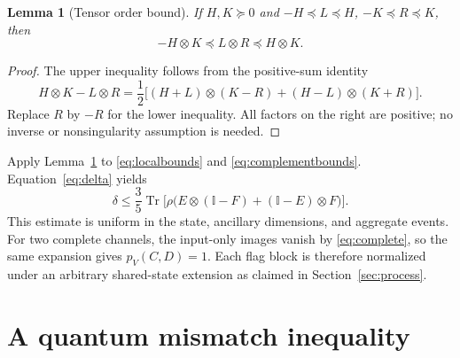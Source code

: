 \documentclass[11pt,letterpaper]{article}
\newtheorem{lemma}[theorem]{Lemma}
\theoremstyle{remark}\newtheorem{remark}[theorem]{Remark}
\newcommand{\Tr}{\operatorname{Tr}}
\newcommand{\I}{\mathbb I}
\begin{document}
\begin{lemma}[Tensor order bound]\label{lem:tensor}
If $H,K\succeq0$ and $-H\preceq L\preceq H$, $-K\preceq R\preceq K$, then
\[
 -H\otimes K\preceq L\otimes R\preceq H\otimes K.
\]
\end{lemma}
\begin{proof}
The upper inequality follows from the positive-sum identity
\[
 H\otimes K-L\otimes R
 =\frac12\bigl[(H+L)\otimes(K-R)+(H-L)\otimes(K+R)\bigr].
\]
Replace $R$ by $-R$ for the lower inequality. All factors on the right are positive; no inverse or nonsingularity assumption is needed.
\end{proof}

Apply Lemma~\ref{lem:tensor} to \eqref{eq:localbounds} and \eqref{eq:complementbounds}. Equation~\eqref{eq:delta} yields
\begin{equation}\label{eq:delta-bound}
 \delta\le\frac35\Tr\bigl[\rho\bigl(E\otimes(\I-F)
                              +(\I-E)\otimes F\bigr)\bigr].
\end{equation}
This estimate is uniform in the state, ancillary dimensions, and aggregate events. For two complete channels, the input-only images vanish by \eqref{eq:complete}, so the same expansion gives $p_V(C,D)=1$. Each flag block is therefore normalized under an arbitrary shared-state extension as claimed in Section~\ref{sec:process}.

\section{A quantum mismatch inequality}\label{sec:mismatch}
\end{document}
